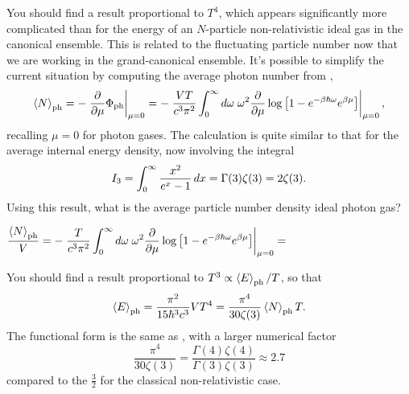 You should find a result proportional to $T^4$, which appears significantly more complicated than  for the energy of an $N$-particle non-relativistic ideal gas in the canonical ensemble.
This is related to the fluctuating particle number now that we are working in the grand-canonical ensemble.
It's possible to simplify the current situation by computing the average photon number from ,
\begin{equation*}
  \left\langle N \right\rangle_{\text{ph}} = -\left. \frac{\partial }{\partial \mu} \Phi_{\text{ph}}\right|_{\mu = 0} = -\left. \frac{VT}{c^3 \pi^2} \int_0^{\infty} d\omega \; \omega^2 \frac{\partial }{\partial \mu} \log\left[1 - e^{-\beta \hbar \omega} e^{\beta \mu}\right] \right|_{\mu = 0},
\end{equation*}
recalling $\mu = 0$ for photon gases.
The calculation is quite similar to that for the average internal energy density, now involving the integral
\begin{equation*}
  I_3 = \int_0^{\infty} \frac{x^2}{e^x - 1} \mathop{dx} = \Gamma(3) \zeta(3) = 2\zeta(3).
\end{equation*}
Using this result, what is the average particle number density ideal photon gas?
\begin{mdframed}
  $\displaystyle \frac{\left\langle N \right\rangle_{\text{ph}}}{V} = -\left. \frac{T}{c^3 \pi^2} \int_0^{\infty} d\omega \; \omega^2 \frac{\partial }{\partial \mu} \log\left[1 - e^{-\beta \hbar \omega} e^{\beta \mu}\right] \right|_{\mu = 0} = $ \\[120 pt]
\end{mdframed}

You should find a result proportional to $T^3 \propto \left\langle E \right\rangle_{\text{ph}} / T$, so that
\begin{equation}
  \label{eq:photon_gas_energy}
  \left\langle E \right\rangle_{\text{ph}} = \frac{\pi^2}{15 \hbar^3 c^3} VT^4 = \frac{\pi^4}{30\zeta(3)} \left\langle N \right\rangle_{\text{ph}} T.
\end{equation}
The functional form is the same as , with a larger numerical factor
\begin{equation*}
  \frac{\pi^4}{30\zeta(3)} = \frac{\Gamma(4) \zeta(4)}{\Gamma(3) \zeta(3)} \approx 2.7
\end{equation*}
compared to the $\frac{3}{2}$ for the classical non-relativistic case.

